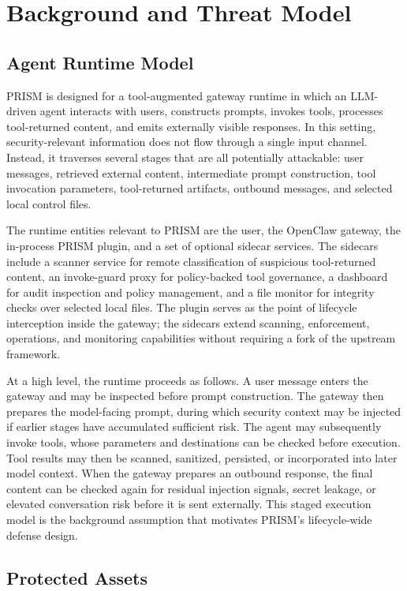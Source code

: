 \section{Background and Threat Model}

\subsection{Agent Runtime Model}

PRISM is designed for a tool-augmented gateway runtime in which an LLM-driven agent interacts with users, constructs prompts, invokes tools, processes tool-returned content, and emits externally visible responses. In this setting, security-relevant information does not flow through a single input channel. Instead, it traverses several stages that are all potentially attackable: user messages, retrieved external content, intermediate prompt construction, tool invocation parameters, tool-returned artifacts, outbound messages, and selected local control files.

The runtime entities relevant to PRISM are the user, the OpenClaw gateway, the in-process PRISM plugin, and a set of optional sidecar services. The sidecars include a scanner service for remote classification of suspicious tool-returned content, an invoke-guard proxy for policy-backed tool governance, a dashboard for audit inspection and policy management, and a file monitor for integrity checks over selected local files. The plugin serves as the point of lifecycle interception inside the gateway; the sidecars extend scanning, enforcement, operations, and monitoring capabilities without requiring a fork of the upstream framework.

At a high level, the runtime proceeds as follows. A user message enters the gateway and may be inspected before prompt construction. The gateway then prepares the model-facing prompt, during which security context may be injected if earlier stages have accumulated sufficient risk. The agent may subsequently invoke tools, whose parameters and destinations can be checked before execution. Tool results may then be scanned, sanitized, persisted, or incorporated into later model context. When the gateway prepares an outbound response, the final content can be checked again for residual injection signals, secret leakage, or elevated conversation risk before it is sent externally. This staged execution model is the background assumption that motivates PRISM's lifecycle-wide defense design.

\subsection{Protected Assets}

